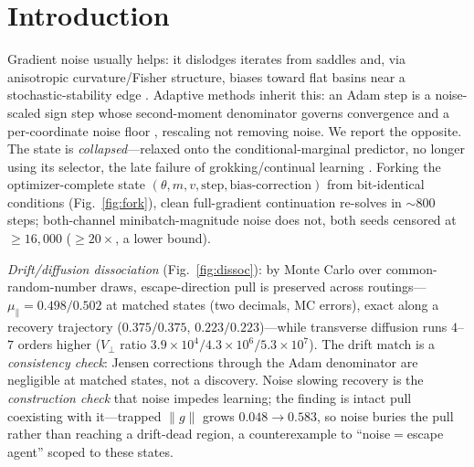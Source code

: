\documentclass[10pt]{article}
\begin{document}
\begin{abstract}
We study one task at one learning rate over finite horizons; what we intend to export is the structure---a drift-preserving, diffusion-dominated trap and the routing-dependent power accounting that exposes it---not the particular multipliers.
\end{abstract}




\section{Introduction}
\label{sec:intro}

Gradient noise usually helps: it dislodges iterates from saddles \citep{saddle} and, via anisotropic curvature/Fisher structure, biases toward flat basins \citep{zhu,wumae,wenfisher,ziyin} near a stochastic-stability edge \citep{eoss}. Adaptive methods inherit this: an Adam step is a noise-scaled sign step \citep{adam,balleshennig,kunstner} whose second-moment denominator governs convergence \citep{amsgrad} and a per-coordinate noise floor \citep{dpadambc,litramer}, rescaling not removing noise. We report the opposite. The state is \emph{collapsed}---relaxed onto the conditional-marginal predictor, no longer using its selector, the late failure of grokking/continual learning \citep{antigrok,dohare,stochcollapse}. Forking the optimizer-complete state $(\theta,m,v,\text{step},\text{bias-correction})$ from bit-identical conditions (Fig.~\ref{fig:fork}), clean full-gradient continuation re-solves in ${\sim}800$ steps; both-channel minibatch-magnitude noise does not, both seeds censored at $\ge16{,}000$ ($\ge20\times$, a lower bound).

\emph{Drift/diffusion dissociation} (Fig.~\ref{fig:dissoc}): by Monte Carlo over common-random-number draws, escape-direction pull is preserved across routings---$\mu_\parallel=0.498/0.502$ at matched states (two decimals, MC errors), exact along a recovery trajectory ($0.375/0.375$, $0.223/0.223$)---while transverse diffusion runs $4$--$7$ orders higher ($V_\perp$ ratio $3.9{\times}10^4/4.3{\times}10^6/5.3{\times}10^7$). The drift match is a \emph{consistency check}: Jensen corrections through the Adam denominator are negligible at matched states, not a discovery. Noise slowing recovery is the \emph{construction check} that noise impedes learning; the finding is intact pull coexisting with it---trapped $\|g\|$ grows $0.048{\to}0.583$, so noise buries the pull rather than reaching a drift-dead region, a counterexample to ``noise$=$escape agent'' scoped to these states.
\end{document}
